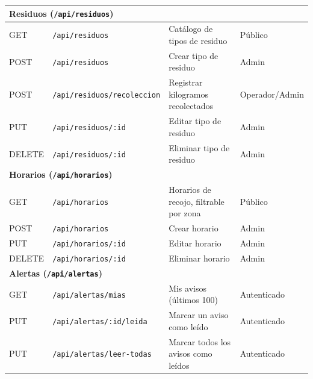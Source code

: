 \documentclass[11pt,a4paper]{article}
\begin{document}
\begin{longtable}{|p{1.6cm}|p{4.6cm}|p{6cm}|p{1.8cm}|}
\multicolumn{4}{|l|}{\cellcolor{grisclaro}\textbf{Residuos (\texttt{/api/residuos})}} \\
\hline
GET & \texttt{/api/residuos} & Catálogo de tipos de residuo & Público \\
\hline
POST & \texttt{/api/residuos} & Crear tipo de residuo & Admin \\
\hline
POST & \texttt{/api/residuos/recoleccion} & Registrar kilogramos recolectados & Operador/Admin \\
\hline
PUT & \texttt{/api/residuos/:id} & Editar tipo de residuo & Admin \\
\hline
DELETE & \texttt{/api/residuos/:id} & Eliminar tipo de residuo & Admin \\
\hline

\multicolumn{4}{|l|}{\cellcolor{grisclaro}\textbf{Horarios (\texttt{/api/horarios})}} \\
\hline
GET & \texttt{/api/horarios} & Horarios de recojo, filtrable por zona & Público \\
\hline
POST & \texttt{/api/horarios} & Crear horario & Admin \\
\hline
PUT & \texttt{/api/horarios/:id} & Editar horario & Admin \\
\hline
DELETE & \texttt{/api/horarios/:id} & Eliminar horario & Admin \\
\hline

\multicolumn{4}{|l|}{\cellcolor{grisclaro}\textbf{Alertas (\texttt{/api/alertas})}} \\
\hline
GET & \texttt{/api/alertas/mias} & Mis avisos (últimos 100) & Autenticado \\
\hline
PUT & \texttt{/api/alertas/:id/leida} & Marcar un aviso como leído & Autenticado \\
\hline
PUT & \texttt{/api/alertas/leer-todas} & Marcar todos los avisos como leídos & Autenticado \\
\hline


\end{longtable}
\end{document}
